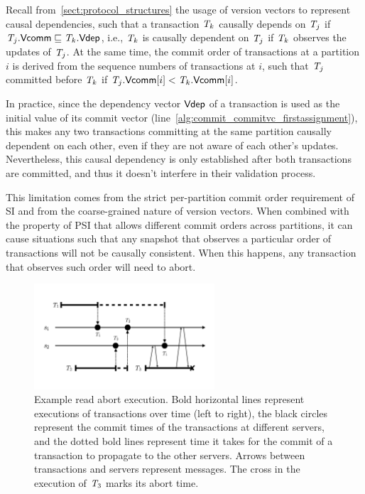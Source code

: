 Recall from~\ref{sect:protocol_structures} the usage of version vectors to represent causal dependencies, such that a transaction $\mathit{T}_k$ causally depends on $\mathit{T}_j$ if $\mathit{T}_j.\mathsf{Vcomm} \sqsubseteq \mathit{T}_k.\mathsf{Vdep}$, i.e., $\mathit{T}_k$ is causally dependent on $\mathit{T}_j$ if $\mathit{T}_k$ observes the updates of $\mathit{T}_j$. At the same time, the commit order of transactions at a partition $i$ is derived from the sequence numbers of transactions at $i$, such that $\mathit{T}_j$ committed before $\mathit{T}_k$ if $\mathit{T}_j.\mathsf{Vcomm}[i] < \mathit{T}_k.\mathsf{Vcomm}[i]$.

In practice, since the dependency vector $\mathsf{Vdep}$ of a transaction is used as the initial value of its commit vector (line~\ref{alg:commit_commitvc_firstassignment}), this makes any two transactions committing at the same partition causally dependent on each other, even if they are not aware of each other's updates. Nevertheless, this causal dependency is only established after both transactions are committed, and thus it doesn't interfere in their validation process.


This limitation comes from the strict per-partition commit order requirement of SI and from the coarse-grained nature of version vectors. When combined with the property of PSI that allows different commit orders across partitions, it can cause situations such that any snapshot that observes a particular order of transactions will not be causally consistent. When this happens, any transaction that observes such order will need to abort.

\begin{figure}[t]
\centering
\includegraphics[width=0.6\textwidth]{figures/ch4_abort_execution.pdf}
\vspace{-0.5cm}
\caption{Example read abort execution. Bold horizontal lines represent executions of transactions over time (left to right), the black circles represent the commit times of the transactions at different servers, and the dotted bold lines represent time it takes for the commit of a transaction to propagate to the other servers. Arrows between transactions and servers represent messages. The cross in the execution of $\mathit{T}_3$ marks its abort time. }
\label{fig:read_abort}
\end{figure}

